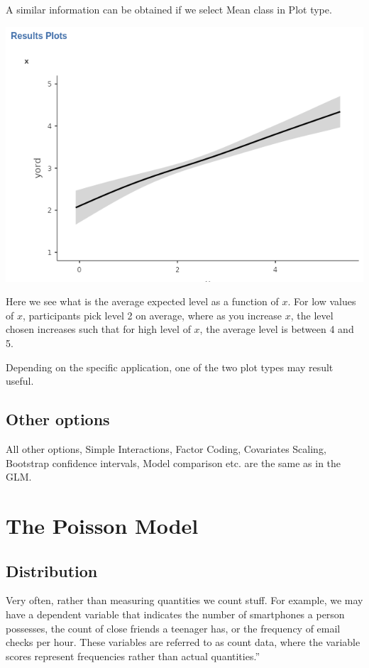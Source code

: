 \documentclass[
]{book}
\begin{document}
A similar information can be obtained if we select {Mean class} in {Plot type}.

\includegraphics{bookletpics/3_ordinal_plot2.png}

Here we see what is the average expected level as a function of \(x\). For low values of \(x\), participants pick level 2 on average, where as you increase \(x\), the level chosen increases such that for high level of \(x\), the average level is between 4 and 5.

Depending on the specific application, one of the two plot types may result useful.

\hypertarget{other-options-2}{%
\subsection{Other options}\label{other-options-2}}

All other options, {Simple Interactions}, {Factor Coding}, {Covariates Scaling}, {Bootstrap} confidence intervals, {Model comparison} etc. are the same as in the GLM.

\hypertarget{poisson}{%
\section{The Poisson Model}\label{poisson}}

\hypertarget{distribution}{%
\subsection{Distribution}\label{distribution}}

Very often, rather than measuring quantities we count stuff. For example, we may have a dependent variable that indicates the number of smartphones a person possesses, the count of close friends a teenager has, or the frequency of email checks per hour. These variables are referred to as count data, where the variable scores represent frequencies rather than actual quantities.''
\end{document}
